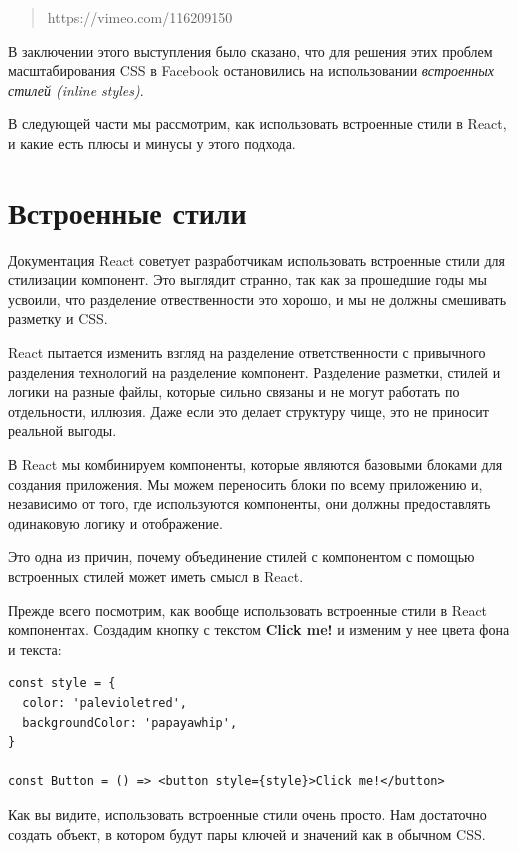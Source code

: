 \begin{quotation}
https://vimeo.com/116209150	
\end{quotation}

В заключении этого выступления было сказано, что для решения этих проблем масштабирования CSS в Facebook остановились на использовании \textit{встроенных стилей (inline styles)}.

В следующей части мы рассмотрим, как использовать встроенные стили в React, и какие есть плюсы и минусы у этого подхода.

\section{Встроенные стили}

Документация React советует разработчикам использовать встроенные стили для стилизации компонент. Это выглядит странно, так как за прошедшие годы мы усвоили, что разделение отвественности это хорошо, и мы не должны смешивать разметку и CSS.

React пытается изменить взгляд на разделение ответственности с привычного разделения технологий на разделение компонент. Разделение разметки, стилей и логики на разные файлы, которые сильно связаны и не могут работать по отдельности, иллюзия. Даже если это делает структуру чище, это не приносит реальной выгоды.

В React мы комбинируем компоненты, которые являются базовыми блоками для создания приложения. Мы можем переносить блоки по всему приложению и, независимо от того, где используются компоненты, они должны предоставлять одинаковую логику и отображение.

Это одна из причин, почему объединение стилей с компонентом с помощью встроенных стилей может иметь смысл в React.

Прежде всего посмотрим, как вообще использовать встроенные стили в React компонентах. Создадим кнопку с текстом \textbf{Click me!} и изменим у нее цвета фона и текста:

\begin{lstlisting}
const style = {
  color: 'palevioletred',
  backgroundColor: 'papayawhip',
}

const Button = () => <button style={style}>Click me!</button>
\end{lstlisting}

Как вы видите, использовать встроенные стили очень просто. Нам достаточно создать объект, в котором будут пары ключей и значений как в обычном CSS.


